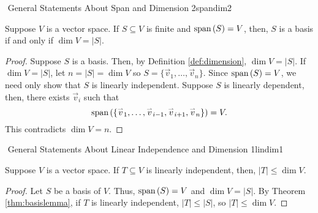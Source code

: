         \begin{theorem}{\Stop\,\,General Statements About Span and Dimension 2}{spandim2}
            
            Suppose \(V\) is a vector space. If \(S\subseteq V\) is finite and \(\text{span\,}(S)=V\), then, \(S\) is a basis if and only if \(\dim V = |S|\).
            \begin{proof}
                Suppose \(S\) is a basis. Then, by Definition \ref{def:dimension}, \(\dim V = |S|\). If \(\dim V = |S|\), let \(n=|S|=\dim V\) so \(S=\{\vec{v}_1,\ldots,\vec{v}_n\}\). Since \(\text{span\,}(S)=V\), we need only show that \(S\) is linearly independent. Suppose \(S\) is linearly dependent, then, there exists \(\vec{v}_i\) such that
                \begin{equation*}
                    \text{span\,}(\{\overset{_{\rightharpoonup}}{v}_1,\ldots,\overset{_{\rightharpoonup}}{v}_{i-1},\overset{_{\rightharpoonup}}{v}_{i+1},\overset{_{\rightharpoonup}}{v}_n\})=V.
                \end{equation*}
                This contradicts \(\dim V = n\). 
            \end{proof}

        \end{theorem}
        \begin{theorem}{\Stop\,\,General Statements About Linear Independence and Dimension 1}{lindim1}
            
            Suppose \(V\) is a vector space. If \(T\subseteq V\) is linearly independent, then, \(|T|\leq\dim V\).
            \begin{proof}
                Let \(S\) be a basis of \(V\). Thus, \(\text{span\,}(S)=V\) and \(\dim V=|S|\). By Theorem \ref{thm:basislemma}, if \(T\) is linearly independent, \(|T|\leq|S|\), so \(|T|\leq\dim V\).
            \end{proof}
        
        \end{theorem}
        \pagebreak
